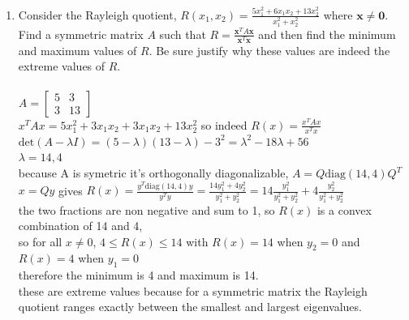 \documentclass{article}
\begin{document}
{{\begin{enumerate}
\newpage\item Consider the Rayleigh quotient, $\displaystyle{R(x_1,x_2)=\frac{5x_1^2+6x_1x_2+13x_2^2}{x_1^2+x_2^2}}$ where $\bm{x}\neq\bm{0}$. Find a symmetric matrix $A$ such that $\displaystyle{R=\frac{\bm{x}^TA\bm{x}}{\bm{x}^T\bm{x}}}$ and then find the minimum and maximum values of $R$. Be sure justify why these values are indeed the extreme values of $R$.
\\
\\$A=\left[\begin{array}{cc} 5 & 3 \\ 3 & 13 \end{array}\right]$
\\$x^TAx=5x_1^2+3x_1x_2+3x_1x_2+13x_2^2$ so indeed $R(x)=\frac{x^TAx}{x^Tx}$
\\$\textrm{det}(A-\lambda I)=(5-\lambda)(13-\lambda)-3^2=\lambda^2-18\lambda+56$
\\$\lambda=14,4$
\\because A is symetric it's orthogonally diagonalizable, $A=Q\textrm{diag}(14,4)Q^T$
\\$x=Qy$ gives $R(x)=\frac{y^T\textrm{diag}(14,4)y}{y^Ty}=\frac{14y_1^2+4y_2^2}{y_1^2+y_2^2}=14\frac{y_1^2}{y_1^2+y_2^2}+4\frac{y_2^2}{y_1^2+y_2^2}$
\\the two fractions are non negative and sum to 1, so $R(x)$ is a convex combination of 14 and 4, 
\\so for all $x\neq0$, $4\leq R(x)\leq14$ with $R(x)=14$ when $y_2=0$ and $R(x)=4$ when $y_1=0$
\\therefore the minimum is 4 and maximum is 14.
\\these are extreme values because for a symmetric matrix the Rayleigh quotient ranges exactly between the smallest and largest eigenvalues.


\end{enumerate}}}
\end{document}
